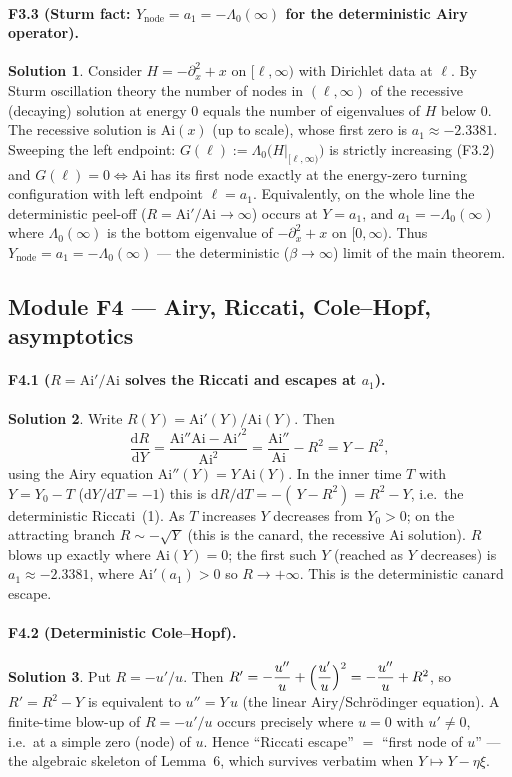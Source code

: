 \documentclass[11pt]{article}
\newcommand{\Ai}{\mathrm{Ai}}
\newcommand{\dd}{\mathrm{d}}
\newcommand{\Ynode}{Y_{\mathrm{node}}}
\newcommand{\Lam}{\Lambda_0}
\theoremstyle{definition}
\newtheorem*{sol}{Solution}
\begin{document}
\paragraph{F3.3 (Sturm fact: $\Ynode=a_1=-\Lam(\infty)$ for the deterministic Airy operator).}
\begin{sol}
Consider $H=-\partial_x^2+x$ on $[\ell,\infty)$ with Dirichlet data at $\ell$. By Sturm
oscillation theory the number of nodes in $(\ell,\infty)$ of the recessive (decaying) solution
at energy $0$ equals the number of eigenvalues of $H$ below $0$. The recessive solution is
$\Ai(x)$ (up to scale), whose first zero is $a_1\approx-2.3381$. Sweeping the left endpoint:
$G(\ell):=\Lambda_0\bigl(H|_{[\ell,\infty)}\bigr)$ is strictly increasing (F3.2) and
$G(\ell)=0\iff \Ai$ has its first node exactly at the energy-zero turning configuration with left
endpoint $\ell=a_1$. Equivalently, on the whole line the deterministic peel-off
($R=\Ai'/\Ai\to\infty$) occurs at $Y=a_1$, and $a_1=-\Lambda_0(\infty)$ where
$\Lambda_0(\infty)$ is the bottom eigenvalue of $-\partial_x^2+x$ on $[0,\infty)$. Thus
$\Ynode=a_1=-\Lambda_0(\infty)$ --- the deterministic ($\beta\to\infty$) limit of the main
theorem.
\end{sol}

\subsection*{Module F4 --- Airy, Riccati, Cole--Hopf, asymptotics}

\paragraph{F4.1 ($R=\Ai'/\Ai$ solves the Riccati and escapes at $a_1$).}
\begin{sol}
Write $R(Y)=\Ai'(Y)/\Ai(Y)$. Then
\[
\frac{\dd R}{\dd Y}=\frac{\Ai''\Ai-\Ai'^2}{\Ai^2}=\frac{\Ai''}{\Ai}-R^2=Y-R^2,
\]
using the Airy equation $\Ai''(Y)=Y\,\Ai(Y)$. In the inner time $T$ with $Y=Y_0-T$
($\dd Y/\dd T=-1$) this is $\dd R/\dd T=-(\,Y-R^2)=R^2-Y$, i.e.\ the deterministic Riccati~(1).
As $T$ increases $Y$ decreases from $Y_0>0$; on the attracting branch $R\sim-\sqrt{Y}$ (this is
the canard, the recessive $\Ai$ solution). $R$ blows up exactly where $\Ai(Y)=0$; the first such
$Y$ (reached as $Y$ decreases) is $a_1\approx-2.3381$, where $\Ai'(a_1)>0$ so $R\to+\infty$.
This is the deterministic canard escape.
\end{sol}

\paragraph{F4.2 (Deterministic Cole--Hopf).}
\begin{sol}
Put $R=-u'/u$. Then $R'=-\dfrac{u''}{u}+\Bigl(\dfrac{u'}{u}\Bigr)^2=-\dfrac{u''}{u}+R^2$, so
$R'=R^2-Y$ is equivalent to $u''=Y\,u$ (the linear Airy/Schr\"odinger equation). A finite-time
blow-up of $R=-u'/u$ occurs precisely where $u=0$ with $u'\neq0$, i.e.\ at a simple zero (node)
of $u$. Hence ``Riccati escape'' $=$ ``first node of $u$'' --- the algebraic skeleton of
Lemma~6, which survives verbatim when $Y\mapsto Y-\eta\xi$.
\end{sol}
\end{document}
